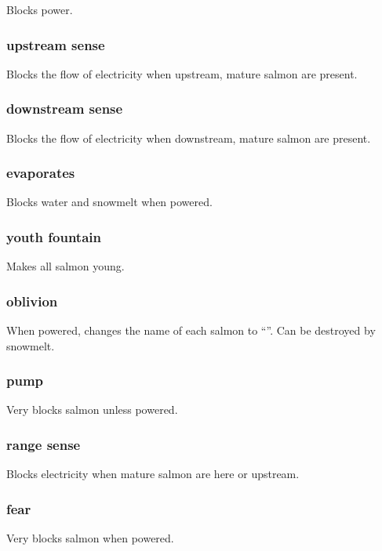 \documentclass[10pt]{article}
\begin{document}
Blocks power.

\subsubsection{upstream sense}

Blocks the flow of electricity when upstream, mature salmon are present.

\subsubsection{downstream sense}

Blocks the flow of electricity when downstream, mature salmon are present.

\subsubsection{evaporates}

Blocks water and snowmelt when powered.

\subsubsection{youth fountain}

Makes all salmon young.

\subsubsection{oblivion}

When powered, changes the name of each salmon to ``''. Can be destroyed by snowmelt.

\subsubsection{pump}

Very blocks salmon unless powered.

\subsubsection{range sense}

Blocks electricity when mature salmon are here or upstream.

\subsubsection{fear}

Very blocks salmon when powered.
\end{document}
